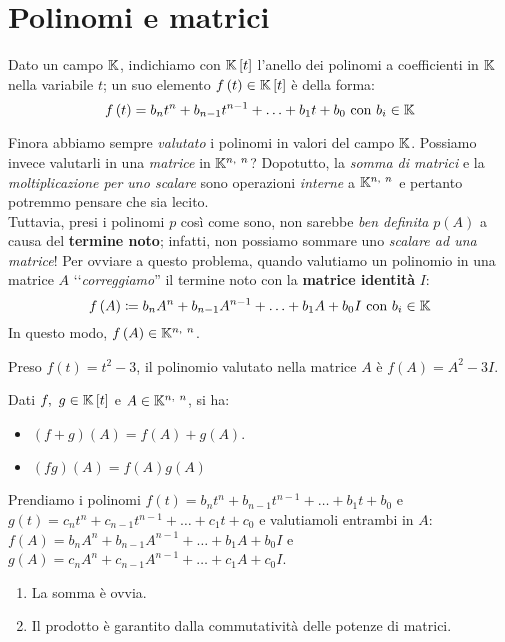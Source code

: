 \section{Polinomi e matrici}
\begin{remember}
	Dato un campo $\mathbb{K}$, indichiamo con $\mathbb{K}\left[t\right]$ l'anello dei polinomi a coefficienti in $\mathbb{K}$ nella variabile $t$; un suo elemento $f\left(t\right)\in\mathbb{K}\left[t\right]$ è della forma:
	\begin{equation}
		f\left(t\right)=b_nt^n+b_{n-1}t^{n-1}+\ldots+b_1t+b_0\text{ con }b_i\in\mathbb{K}
	\end{equation}
\vspace{-6mm}
\end{remember}
Finora abbiamo sempre \textit{valutato} i polinomi in valori del campo $\mathbb{K}$. Possiamo invece valutarli in una \textit{matrice} in $\kamp^{n,\ n}$? Dopotutto, la \textit{somma di matrici} e la \textit{moltiplicazione per uno scalare} sono operazioni \textit{interne} a $\kamp^{n,\ n}$ e pertanto potremmo pensare che sia lecito.\\ Tuttavia, presi i polinomi $p$ così come sono, non sarebbe \textit{ben definita} $p\left(A\right)$ a causa del \textbf{termine noto}; infatti, non possiamo sommare uno \textit{scalare ad una matrice}! Per ovviare a questo problema, quando valutiamo un polinomio in una matrice $A$ ‘‘\textit{correggiamo}'' il termine noto con la \textbf{matrice identità} $I$:
\begin{equation}
	f\left(A\right)\coloneqq b_nA^n+b_{n-1}A^{n-1}+\ldots+b_1A+b_0I\text{ con }b_i\in\mathbb{K}
\end{equation}
In questo modo, $f\left(A\right)\in\kamp^{n,\ n}$.
\begin{example}
Preso $f\left(t\right)=t^2-3$, il polinomio valutato nella matrice $A$ è $f\left(A\right)=A^2-3I$.
\end{example}
\begin{observe}
	Dati $f,\ g\in\mathbb{K}\left[t\right]$ e $A\in\mathbb{K}^{n,\ n}$, si ha:
	\begin{itemize}
		\item $\left(f+g\right)\left(A\right)=f\left(A\right)+g\left(A\right)$.
		\item $\left(fg\right)\left(A\right)=f\left(A\right)g\left(A\right)$
	\end{itemize}
\vspace{-3mm}
\end{observe}
\begin{demonstration}
	Prendiamo i polinomi $f\left(t\right)=b_nt^n+b_{n-1}t^{n-1}+\ldots+b_1t+b_0$ e $g\left(t\right)=c_nt^n+c_{n-1}t^{n-1}+\ldots+c_1t+c_0$ e valutiamoli entrambi in $A$: $f\left(A\right)=b_nA^n+b_{n-1}A^{n-1}+\ldots+b_1A+b_0I$ e $g\left(A\right)=c_nA^n+c_{n-1}A^{n-1}+\ldots+c_1A+c_0I$.
	\begin{enumerate}[label=\Roman*]
		\item La somma è ovvia.
		\item Il prodotto è garantito dalla commutatività delle potenze di matrici.
	\end{enumerate}
\vspace{-3mm}
\end{demonstration}
